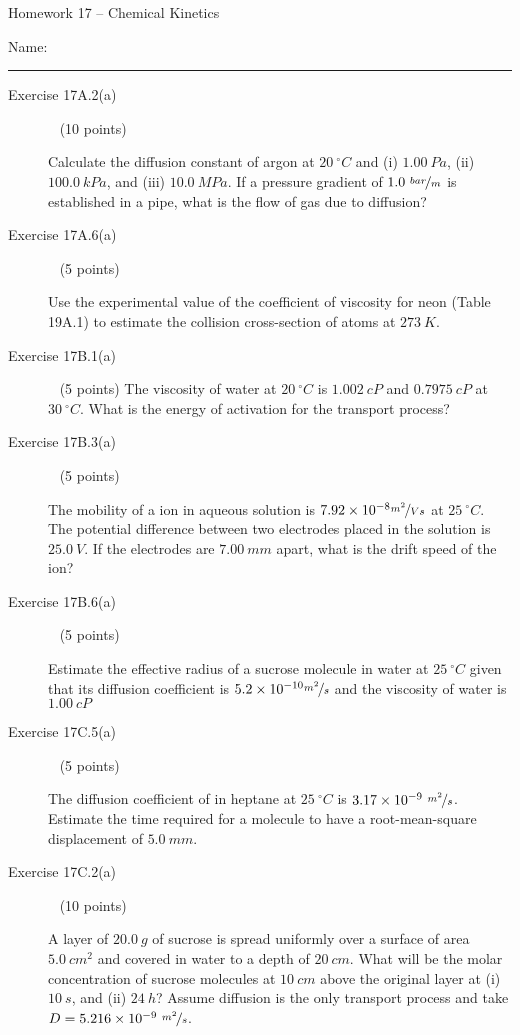 \documentclass[12pt, openany, letterpaper]{memoir}
\begin{document}
\begin{center}
	{\large Homework 17 -- Chemical Kinetics}
\end{center}

Name: \rule[-.1mm]{15em}{0.1pt}

\begin{description}	
	\item [Exercise 17A.2(a)] ~ (10 points)
	
	Calculate the diffusion constant of argon at $20~^\circ C$ and (i) $1.00~Pa$, (ii) $100.0~kPa$, and (iii) $10.0~MPa$. If a pressure gradient of $1.0~\nicefrac{bar}{m}$ is established in a pipe, what is the flow of gas due to diffusion?
	
	
	\vspace{19em}
	\item [Exercise 17A.6(a)] ~ (5 points)
	
	Use the experimental value of the coefficient of viscosity for neon (Table 19A.1) to estimate the collision cross-section of  atoms at $273~K$.
	
	\vspace{20em}
	\item [Exercise 17B.1(a)] ~ (5 points)
	The viscosity of water at $20~^\circ C$ is $1.002~cP$ and $0.7975~cP$ at $30~^\circ C$. What is the energy of activation for the transport process?
	
	\vspace{23em}
	\item [Exercise 17B.3(a)] ~ (5 points)
	
	The mobility of a  ion in aqueous solution is $7.92\times10^{-8}\nicefrac{m^2}{Vs}$ at $25~^\circ C$. The potential difference between two electrodes placed in the solution is $25.0~V$. If the electrodes are $7.00~mm$ apart, what is the drift speed of the  ion?
	
	\vspace{23em}	
	\item [Exercise 17B.6(a)] ~ (5 points)
	
	Estimate the effective radius of a sucrose molecule in water at $25~^\circ C$ given that its diffusion coefficient is $5.2\times10^{-10}\nicefrac{m^2}{s}$ and the viscosity of water is $1.00~cP$
	
	\vspace{23em}	
	\item [Exercise 17C.5(a)] ~ (5 points)	
	
	The diffusion coefficient of  in heptane at $25~^\circ C$ is $3.17\times10^{-9}~\nicefrac{m^2}{s}$. Estimate the time required for a  molecule to have a root-mean-square displacement of $5.0~mm$.	
	
	\vspace{23em}	
	\item [Exercise 17C.2(a)] ~ (10 points)	

	A layer of $20.0~g$ of sucrose is spread uniformly over a surface of area $5.0~cm^2$ and covered in water to a depth of $20~cm$. What will be the molar concentration of sucrose molecules at $10~cm$ above the original layer at (i) $10~s$, and (ii) $24~h$? Assume diffusion is the only transport process and take $D=5.216\times10^{-9}~\nicefrac{m^2}{s}$.
\end{description}
\end{document}
